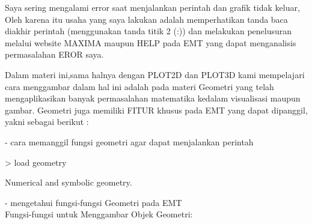 \documentclass[a4paper,10pt]{article}
\begin{document}
\begin{eulernotebook}
\begin{eulercomment}
\begin{eulercomment}
\begin{eulercomment}
Saya sering mengalami error saat menjalankan perintah dan grafik tidak keluar, Oleh karena
itu usaha yang saya lakukan adalah memperhatikan tanda baca diakhir perintah (menggunakan
tanda titik 2 (:)) dan melakukan penelusuran melalui website MAXIMA maupun HELP pada EMT yang
dapat menganalisis permasalahan EROR saya.



\end{eulercomment}
\eulersubheading{}
\eulersubheading{}
\begin{eulercomment}
Dalam materi ini,sama halnya dengan PLOT2D dan PLOT3D kami mempelajari cara menggambar dalam
hal ini adalah pada materi Geometri yang telah mengaplikasikan banyak permasalahan matematika
kedalam visualisasi maupun gambar. Geometri juga memiliki FITUR khusus pada EMT yang dapat
dipanggil, yakni sebagai berikut :

- cara memanggil fungsi geometri agar dapat menjalankan perintah
\end{eulercomment}
\begin{eulerprompt}
> load geometry
\end{eulerprompt}
\begin{euleroutput}
  Numerical and symbolic geometry.
\end{euleroutput}
\begin{eulercomment}
- mengetahui fungsi-fungsi Geometri pada EMT\\
Fungsi-fungsi untuk Menggambar Objek Geometri:


\end{eulercomment}
\end{eulercomment}
\end{eulercomment}
\end{eulernotebook}
\end{document}

